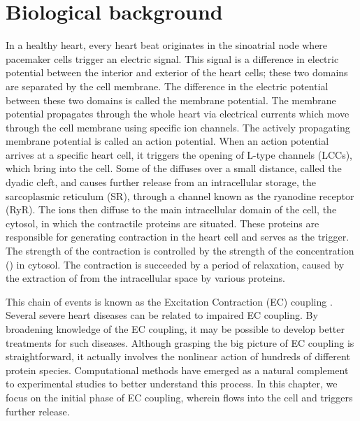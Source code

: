 \section{Biological background}
 
In a healthy heart, every heart beat originates in the
sinoatrial node where pacemaker cells trigger an electric signal. This
signal is a difference in electric potential between the interior and
exterior of the heart cells; these two domains are separated by the
cell membrane. The difference in the electric potential between these
two domains is called the membrane potential. The membrane potential
propagates through the whole heart via electrical currents which move
through the cell membrane using specific ion channels. The actively
propagating membrane potential is called an action potential. When an
action potential arrives at a specific heart cell, it triggers the
opening of L-type \Ca channels (LCCs), which bring \Ca into the
cell. Some of the \Ca diffuses over a small distance, called the
dyadic cleft, and causes further \Ca release from an intracellular \Ca
storage, the sarcoplasmic reticulum (SR), through a channel known as
the ryanodine receptor (RyR). The \Ca ions then diffuse to the main
intracellular domain of the cell, the cytosol, in which the
contractile proteins are situated. These proteins are responsible for
generating contraction in the heart cell and \Ca serves as the
trigger. The strength of the contraction is controlled by the strength
of the \Ca concentration (\CaC) in cytosol. The contraction is
succeeded by a period of relaxation, caused by the extraction of \Ca
from the intracellular space by various proteins. \par

This chain of events is known as the Excitation Contraction (EC)
coupling \cite{Bers2001}. Several severe heart diseases can be related
to impaired EC coupling. By broadening knowledge of the EC coupling,
it may be possible to develop better treatments for such
diseases. Although grasping the big picture of EC coupling is
straightforward, it actually involves the nonlinear action of hundreds
of different protein species. Computational methods have emerged as a
natural complement to experimental studies to better understand this
process. In this chapter, we focus on the initial phase of EC
coupling, wherein \Ca flows into the cell and triggers further \Ca
release.\par

